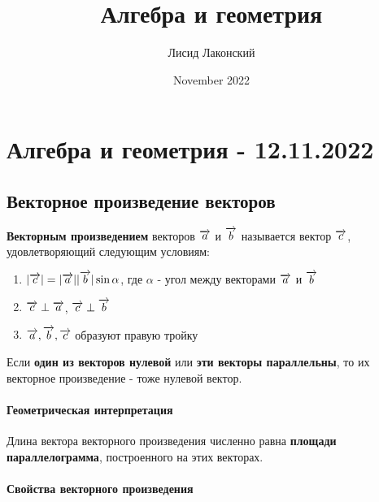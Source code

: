 \documentclass{article}
\title{Алгебра и геометрия}
\author{Лисид Лаконский}
\date{November 2022}
\def\vec{\ensuremath\overrightarrow}
\begin{document}
\maketitle

\tableofcontents
\pagebreak

\section{Алгебра и геометрия - 12.11.2022}

\subsection{Векторное произведение векторов}

\begin{flushleft}

\textbf{Векторным произведением} векторов $\vec{a}$ и $\vec{b}$ называется вектор $\vec{c}$, удовлетворяющий следующим условиям:

\begin{enumerate}
    \item $|\vec{c}| = |\vec{a}| |\vec{b}| \sin \alpha$, где $\alpha$ - угол между векторами $\vec{a}$ и $\vec{b}$
    \item $\vec{c} \perp \vec{a}$, $\vec{c} \perp \vec{b}$
    \item $\vec{a}, \vec{b}, \vec{c}$ образуют правую тройку
\end{enumerate}

Если \textbf{один из векторов нулевой} или \textbf{эти векторы параллельны}, то их векторное произведение - тоже нулевой вектор.

\paragraph{Геометрическая интерпретация}

Длина вектора векторного произведения численно равна \textbf{площади параллелограмма}, построенного на этих векторах.

\paragraph{Свойства векторного произведения}

\begin{multienumerate}
\end{multienumerate}


\end{flushleft}
\end{document}
